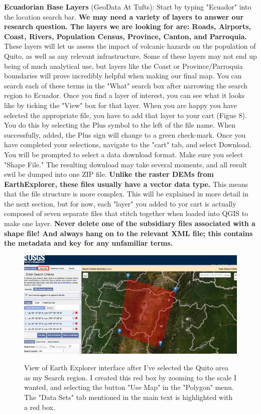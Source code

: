 \documentclass{article}
\begin{document}
\textbf{Ecuadorian Base Layers} (GeoData At Tufts): Start by typing "Ecuador" into the location search bar. \textbf{We may need a variety of layers to answer our research question. The layers we are looking for are: Roads, Airports, Coast, Rivers, Population Census, Province, Canton, and Parroquia.} These layers will let us assess the impact of volcanic hazards on the population of Quito, as well as any relevant infrastructure. Some of these layers may not end up being of much analytical use, but layers like the Coast or Province/Parroquia boundaries will prove incredibly helpful when making our final map. You can search each of these terms in the "What" search box after narrowing the search region to Ecuador. Once you find a layer of interest, you can see what it looks like by ticking the "View" box for that layer. When you are happy you have selected the appropriate file, you have to add that layer to your cart (Figue 8). You do this by selecting the Plus symbol to the left of the file name. When successfully, added, the Plus sign will change to a green check-mark. Once you have completed your selections, navigate to the "cart" tab, and select Download. You will be prompted to select a data download format. Make sure you select "Shape File." The resulting download may take several moments, and all result swil be dumped into one ZIP file. \textbf{Unlike the raster DEMs from EarthExplorer, these files usually have a vector data type.} This means that the file structure is more complex. This will be explained in more detail in the next section, but for now, each "layer" you added to yor cart is actually composed of seven separate files that stitch together when loaded into QGIS to make one layer. \textbf{Never delete one of the subsidiary files associated with a shape file! And always hang on to the relevant XML file; this contains the metadata and key for any unfamiliar terms.}

\begin{figure}[htbp]
    \centering
    \includegraphics[width=\textwidth]{Fig_7_EE.png}
    \label{fig7}
    \caption{View of Earth Explorer interface after I've selected the Quito area as my Search region. I created this red box by zooming to the scale I wanted, and selecting the button "Use Map" in the "Polygon" menu. The "Data Sets" tab mentioned in the main text is highlighted with a red box.}
\end{figure}
\end{document}
